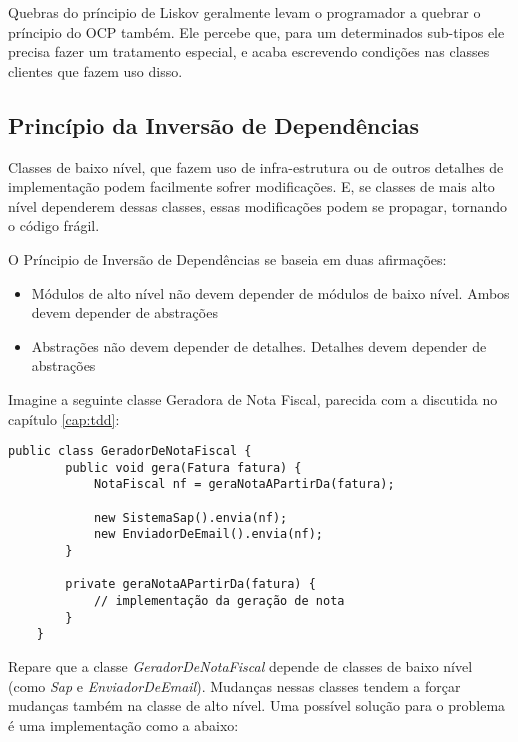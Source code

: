 Quebras do príncipio de Liskov geralmente levam o programador a quebrar o
príncipio do OCP também. Ele percebe que, para um determinados sub-tipos ele 
precisa fazer um tratamento especial, e acaba escrevendo condições nas classes 
clientes que fazem uso disso.

\subsection{Princípio da Inversão de Dependências}
\label{subsec:dip}

Classes de baixo nível, que fazem uso de infra-estrutura ou de outros detalhes
de implementação podem facilmente sofrer modificações. E, se classes de mais alto
nível dependerem dessas classes, essas modificações podem se propagar, tornando
o código frágil.

O Príncipio de Inversão de Dependências se baseia em duas afirmações:

\begin{itemize}
	\item Módulos de alto nível não devem depender de módulos de baixo nível. 
	Ambos devem depender de abstrações
	\item Abstrações não devem depender de detalhes. Detalhes devem depender de
	abstrações
\end{itemize}

Imagine a seguinte classe Geradora de Nota Fiscal, parecida com a discutida no
capítulo \ref{cap:tdd}:

\begin{lstlisting}[frame=trbl]
	public class GeradorDeNotaFiscal {
		public void gera(Fatura fatura) {
			NotaFiscal nf = geraNotaAPartirDa(fatura);
			
			new SistemaSap().envia(nf);
			new EnviadorDeEmail().envia(nf);
		}
		
		private geraNotaAPartirDa(fatura) {
			// implementação da geração de nota
		}
	}
\end{lstlisting}

Repare que a classe \textit{GeradorDeNotaFiscal} depende de classes de baixo
nível (como \textit{Sap} e \textit{EnviadorDeEmail}). Mudanças nessas classes
tendem a forçar mudanças também na classe de alto nível. Uma possível solução para o problema é
uma implementação como a abaixo:

